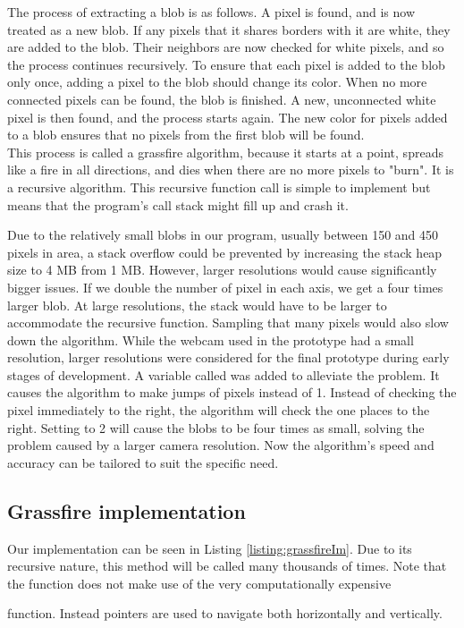 {The process of extracting a blob is as follows. A pixel is found, and is now treated as a new blob. If any pixels that it shares borders with it are white, they are added to the blob. Their neighbors are now checked for white pixels, and so the process continues recursively. To ensure that each pixel is added to the blob only once, adding a pixel to the blob should change its color. When no more connected pixels can be found, the blob is finished. A new, unconnected white pixel is then found, and the process starts again. The new color for pixels added to a blob ensures that no pixels from the first blob will be found.\\
This process is called a grassfire algorithm, because it starts at a point, spreads like a fire in all directions, and dies when there are no more pixels to "burn".
It is a recursive algorithm. This recursive function call is simple to implement but means that the program's call stack might fill up and crash it.  

Due to the relatively small blobs in our program, usually between 150 and 450 pixels in area, a stack overflow could be prevented by increasing the stack heap size to 4 MB from 1 MB. However, larger resolutions would cause significantly bigger issues. If we double the number of pixel in each axis, we get a four times larger blob. At large resolutions, the stack would have to be larger to accommodate the recursive function. Sampling that many pixels would also slow down the algorithm. While the webcam used in the prototype had a small resolution, larger resolutions were considered for the final prototype during early stages of development. A variable called  was added to alleviate the problem. It causes the algorithm to make jumps of  pixels instead of 1. Instead of checking the pixel immediately to the right, the algorithm will check the one  places to the right. Setting  to 2 will cause the blobs to be four times as small, solving the problem caused by a larger camera resolution. Now the algorithm's speed and accuracy can be tailored to suit the specific need.
\subsection{Grassfire implementation}
Our implementation can be seen in Listing \ref{listing:grassfireIm}. Due to its recursive nature, this method will be called many thousands of times. Note that the function does not make use of the very computationally expensive } function. Instead pointers are used to navigate both horizontally and vertically.
